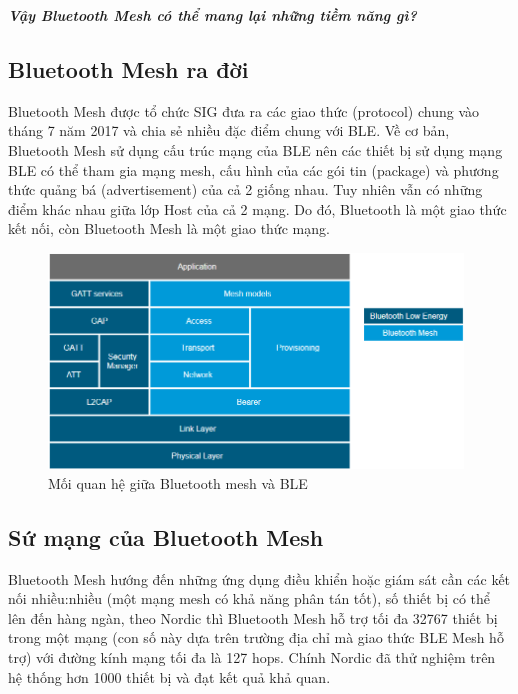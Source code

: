 \textbf{\textit{Vậy Bluetooth Mesh có thể mang lại những tiềm năng gì?}}
    	\subsection{Bluetooth Mesh ra đời}
Bluetooth Mesh được tổ chức SIG đưa ra các giao thức (protocol) chung vào tháng 7 năm 2017\cite{meshborn} và chia sẻ nhiều đặc điểm chung với BLE. Về cơ bản, Bluetooth Mesh sử dụng cấu trúc mạng của BLE nên các thiết bị sử dụng mạng BLE có thể tham gia mạng mesh, cấu hình của các gói tin (package) và phương thức quảng bá (advertisement) của cả 2 giống nhau. Tuy nhiên vẫn có những điểm khác nhau giữa lớp Host của cả 2 mạng. Do đó, Bluetooth là một giao thức kết nối, còn Bluetooth Mesh là một giao thức mạng.
        \begin{figure}[h!]
        	\begin{center}
        		\includegraphics[width=11cm]{images/Bluetooth-mesh-vs-BLE.png}
        		\caption{Mối quan hệ giữa Bluetooth mesh và BLE}
        	\end{center}
        \end{figure}
        \subsection{Sứ mạng của Bluetooth Mesh}
        Bluetooth Mesh hướng đến những ứng dụng điều khiển hoặc giám sát cần các kết nối nhiều:nhiều (một mạng mesh có khả năng phân tán tốt), số thiết bị có thể lên đến hàng ngàn, theo Nordic thì Bluetooth Mesh hỗ trợ tối đa 32767 thiết bị trong một mạng (con số này dựa trên trường địa chỉ mà giao thức BLE Mesh hỗ trợ) với đường kính mạng tối đa là 127 hops\cite{meshconcept}. Chính Nordic đã thử nghiệm trên hệ thống hơn 1000 thiết bị và đạt kết quả khả quan.\\
        
